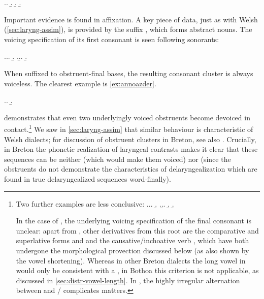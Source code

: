 \ex.\label{ex:lived-fall}\a.
\b.
\b.
\b.

Important evidence is found in affixation. A key piece of data, just as with Welsh  (\cref{sec:laryng-assim}), is provided by the suffix , which forms abstract nouns. The voicing specification of its first consonant is seen following sonorants:

\ex.\a.\a.
\b.
\z.\b.\a.
\b.

When suffixed to obstruent-final bases, the resulting consonant cluster is always voiceless. The clearest example is \ref{ex:annoazder}.

\ex.\label{ex:annoazder}\a.
\b.

 demonstrates that even two underlyingly voiced obstruents become devoiced in contact.\footnote{Two further examples are less conclusive:
\ex.\a.\a.
\b.
\z.\b.\a.
\b.
\b.\mbi{[zɛhtər]}\par
In the case of \ipa{[ˈbrastər]}, the underlying voicing specification of the final consonant is unclear: apart from \ipa{[ˈbrastər]}, other derivatives from this root are the comparative and superlative forms \ipa{[ˈbrasɒh]} and \ipa{[ˈbrasã]} and the causative\fshyp inchoative verb \ipa{[ˈbrasad̥]}, which have both undergone the morphological provection discussed below (as also shown by the vowel shortening). Whereas in other Breton dialects the long vowel in \ipa{[ˈbraːz̥]} would only be consistent with a , in Bothoa this criterion is not applicable, as discussed in \cref{sec:distr-vowel-length}. In \ipa{[ˈzɛhtər]/[ˈzɛstər]}, the highly irregular alternation between \ipa{[h]} and \ipa{[s]}/\ipa{[z]} complicates matters.} We saw in \cref{sec:laryng-assim} that similar behaviour is characteristic of Welsh dialects; for discussion of obstruent clusters in Breton, see also \citet{falchun38:_recher,histbreton,press}. Crucially, in Breton the phonetic realization of laryngeal contrasts makes it clear that these sequences can be neither  (which would make them voiced) nor \featurestring{\rt} (since the obstruents do not demonstrate the characteristics of delaryngealization which are found in true delaryngealized sequences word\hyp finally).

